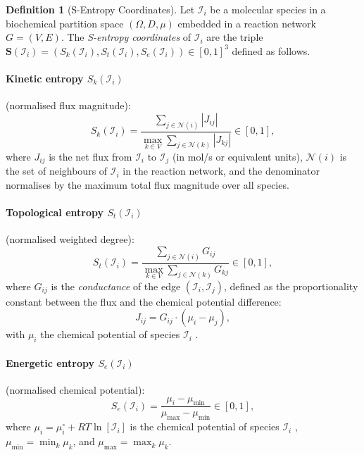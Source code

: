 \documentclass[11pt,twocolumn]{article}
\theoremstyle{plain}
\theoremstyle{definition}
\newtheorem{definition}[theorem]{Definition}
\newcommand{\Sk}{S_k}
\newcommand{\St}{S_t}
\newcommand{\Se}{S_e}
\newcommand{\bS}{\mathbf{S}}
\begin{document}
\begin{definition}[S-Entropy Coordinates]
\label{def:sentropy_coords}
Let $\mathcal{I}_i$ be a molecular species in a biochemical partition space
$(\Omega, D, \mu)$ embedded in a reaction network $G = (V, E)$. The
\emph{S-entropy coordinates} of $\mathcal{I}_i$ are the triple
$\bS(\mathcal{I}_i) = (\Sk(\mathcal{I}_i), \St(\mathcal{I}_i),
\Se(\mathcal{I}_i)) \in [0,1]^3$ defined as follows.

\paragraph{Kinetic entropy $\Sk(\mathcal{I}_i)$} (normalised flux magnitude):
\begin{equation}\label{eq:Sk}
  \Sk(\mathcal{I}_i)
  = \frac{\displaystyle\sum_{j \in \mathcal{N}(i)} |J_{ij}|}
         {\displaystyle\max_{k \in V} \sum_{j \in \mathcal{N}(k)} |J_{kj}|}
  \in [0,1],
\end{equation}
where $J_{ij}$ is the net flux from $\mathcal{I}_i$ to $\mathcal{I}_j$
(in mol/s or equivalent units), $\mathcal{N}(i)$ is the set of neighbours of
$\mathcal{I}_i$ in the reaction network, and the denominator normalises by the
maximum total flux magnitude over all species.

\paragraph{Topological entropy $\St(\mathcal{I}_i)$} (normalised weighted degree):
\begin{equation}\label{eq:St}
  \St(\mathcal{I}_i)
  = \frac{\displaystyle\sum_{j \in \mathcal{N}(i)} G_{ij}}
         {\displaystyle\max_{k \in V} \sum_{j \in \mathcal{N}(k)} G_{kj}}
  \in [0,1],
\end{equation}
where $G_{ij}$ is the \emph{conductance} of the edge $(\mathcal{I}_i,
\mathcal{I}_j)$, defined as the proportionality constant between the flux
and the chemical potential difference:
\begin{equation}\label{eq:conductance}
  J_{ij} = G_{ij} \cdot (\mu_i - \mu_j),
\end{equation}
with $\mu_i$ the chemical potential of species $\mathcal{I}_i$
\cite{onsager1931reciprocal, kondepudi2014modern}.

\paragraph{Energetic entropy $\Se(\mathcal{I}_i)$} (normalised chemical potential):
\begin{equation}\label{eq:Se}
  \Se(\mathcal{I}_i)
  = \frac{\mu_i - \mu_{\min}}{\mu_{\max} - \mu_{\min}}
  \in [0,1],
\end{equation}
where $\mu_i = \mu_i^\circ + RT \ln[\mathcal{I}_i]$ is the chemical potential
of species $\mathcal{I}_i$ \cite{atkins2014physical, alberty2003thermodynamics},
$\mu_{\min} = \min_k \mu_k$, and $\mu_{\max} = \max_k \mu_k$.
\end{definition}
\end{document}
